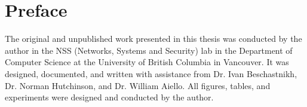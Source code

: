 
\chapter{Preface} 

The original and unpublished work presented in this thesis was conducted by the author in the NSS (Networks, Systems and Security) lab in the Department of Computer Science at the University of
British Columbia in Vancouver. It was designed, documented, and written with assistance from Dr. Ivan Beschastnikh, Dr. Norman Hutchinson, and Dr. William Aiello. All figures, tables, and experiments were designed and conducted by the author.

